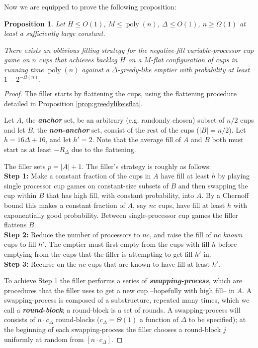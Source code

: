 \documentclass[twocolumn]{article}[10pt]
\newcommand{\defn}[1]{{\textit{\textbf{\boldmath #1}}}\xspace}
\DeclareMathOperator{\poly}{\text{poly}}
\newtheorem{proposition}{Proposition}
\begin{document}
Now we are equipped to prove the following proposition:
\begin{proposition}
  \label{prop:obliviousBase}
  Let $H \le O(1)$, $M \le \poly(n)$, $\Delta \le O(1)$, $n \ge \Omega(1)$ at
  least a sufficiently large constant. 

  There exists an oblivious filling strategy for the negative-fill
  variable-processor cup game on $n$ cups that achieves backlog $H$ on a
  $M$-flat configuration of cups in running time $\poly(n)$ against a
  $\Delta$-greedy-like emptier with probability at least $1-2^{-\Omega(n)}.$
\end{proposition}
\begin{proof}
  The filler starts by flattening the cups, using the flattening procedure
  detailed in Proposition \ref{prop:greedylikeisflat}. 

  Let $A$, the \defn{anchor} set, be an arbitrary (e.g. randomly chosen) subset
  of $n/2$ cups and let $B$, the \defn{non-anchor} set, consist of the rest of
  the cups ($|B| = n/2$). Let $h = 16\Delta + 16$, and let $h' = 2$. Note that
  the average fill of $A$ and $B$ both must start as at least $-R_\Delta$ due
  to the flattening.

  The filler sets $p=|A|+1$. The filler's strategy is roughly as follows: \\
  \textbf{Step 1:} Make a constant fraction of the cups in $A$ have fill at
  least $h$ by playing single processor cup games on constant-size subsets of
  $B$ and then swapping the cup within $B$ that has high fill, with constant
  probability, into $A$. By a Chernoff bound this makes a constant fraction of
  $A$, say $nc$ cups, have fill at least $h$ with exponentially good
  probability. Between single-processor cup games the filler flattens $B$.\\
  \textbf{Step 2:} Reduce the number of processors to $nc$, and raise the fill
  of $nc$ \emph{known} cups to fill $h'$. The emptier must first empty from the
  cups with fill $h$ before emptying from the cups that the filler is
  attempting to get fill $h'$ in.\\
  \textbf{Step 3:} Recurse on the $nc$ cups that are known to have fill at
  least $h'$.

To achieve Step 1 the filler performs a series of \defn{swapping-process},
which are procedures that the filler uses to get a new cup --hopefully with
high fill-- in $A$. A swapping-process is composed of a substructure, repeated
many times, which we call a \defn{round-block}; a round-block is a set of
rounds. A swapping-process will consists of $n\cdot c_\Delta$ round-blocks
($c_\Delta = \Theta(1)$ a function of $\Delta$ to be specified); at the beginning
of each swapping-process the filler chooses a round-block $j$ uniformly at
random from $[n\cdot c_\Delta]$. 


\end{proof}
\end{document}
